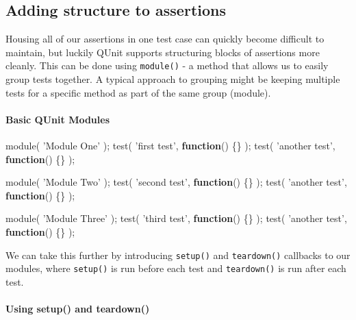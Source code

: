 \documentclass[9pt]{book}
\newenvironment{Shaded}{}{}
\newcommand{\KeywordTok}[1]{\textcolor[rgb]{0.00,0.44,0.13}{\textbf{{#1}}}}
\newcommand{\StringTok}[1]{\textcolor[rgb]{0.25,0.44,0.63}{{#1}}}
\newcommand{\FunctionTok}[1]{\textcolor[rgb]{0.02,0.16,0.49}{{#1}}}
\newcommand{\NormalTok}[1]{{#1}}
\begin{document}
\subsection{Adding structure to
assertions}\label{adding-structure-to-assertions}

Housing all of our assertions in one test case can quickly become
difficult to maintain, but luckily QUnit supports structuring blocks of
assertions more cleanly. This can be done using \texttt{module()} - a
method that allows us to easily group tests together. A typical approach
to grouping might be keeping multiple tests for a specific method as
part of the same group (module).

\paragraph{Basic QUnit Modules}\label{basic-qunit-modules}

\begin{Shaded}
\begin{Highlighting}[]
\FunctionTok{module}\NormalTok{( }\StringTok{'Module One'} \NormalTok{);}
\FunctionTok{test}\NormalTok{( }\StringTok{'first test'}\NormalTok{, }\KeywordTok{function}\NormalTok{() \{\} );}
\FunctionTok{test}\NormalTok{( }\StringTok{'another test'}\NormalTok{, }\KeywordTok{function}\NormalTok{() \{\} );}

\FunctionTok{module}\NormalTok{( }\StringTok{'Module Two'} \NormalTok{);}
\FunctionTok{test}\NormalTok{( }\StringTok{'second test'}\NormalTok{, }\KeywordTok{function}\NormalTok{() \{\} );}
\FunctionTok{test}\NormalTok{( }\StringTok{'another test'}\NormalTok{, }\KeywordTok{function}\NormalTok{() \{\} );}

\FunctionTok{module}\NormalTok{( }\StringTok{'Module Three'} \NormalTok{);}
\FunctionTok{test}\NormalTok{( }\StringTok{'third test'}\NormalTok{, }\KeywordTok{function}\NormalTok{() \{\} );}
\FunctionTok{test}\NormalTok{( }\StringTok{'another test'}\NormalTok{, }\KeywordTok{function}\NormalTok{() \{\} );}
\end{Highlighting}
\end{Shaded}

We can take this further by introducing \texttt{setup()} and
\texttt{teardown()} callbacks to our modules, where \texttt{setup()} is
run before each test and \texttt{teardown()} is run after each test.

\paragraph{Using setup() and teardown()}\label{using-setup-and-teardown}
\end{document}
